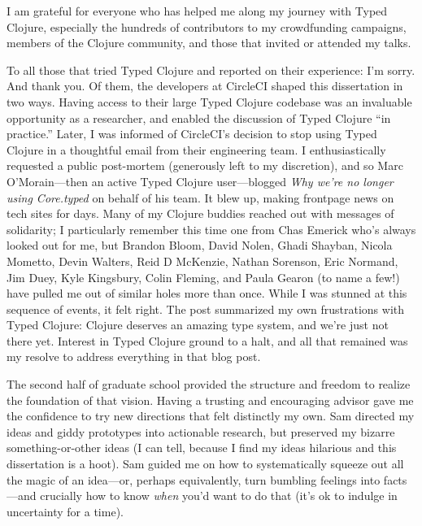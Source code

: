 I am grateful for everyone who has helped me along my journey
with Typed Clojure, especially the hundreds of
contributors to my crowdfunding campaigns, members of the
Clojure community, and those that invited or attended my talks.

To all those that tried Typed Clojure and reported on their experience:
I'm sorry. And thank you.
Of them, the developers at CircleCI shaped this dissertation in two ways.
Having access to their large Typed Clojure
codebase was an invaluable opportunity as a researcher, and enabled the
discussion of Typed Clojure ``in practice.''
Later, I was informed of CircleCI's decision to stop using Typed Clojure
in a thoughtful email from their engineering team.
I enthusiastically requested a public post-mortem (generously left
to my discretion), and so
Marc O'Morain---then an active Typed Clojure user---blogged \emph{Why we're no longer using Core.typed}
on behalf of his team.
It blew up, making frontpage news on tech sites for days.
Many of my Clojure buddies reached out with messages of solidarity; I particularly remember 
this time one from Chas Emerick who's always looked out for me, but Brandon Bloom, David Nolen,
Ghadi Shayban, Nicola Mometto, Devin Walters, Reid D McKenzie, Nathan Sorenson, Eric
Normand, Jim Duey, Kyle Kingsbury, Colin Fleming, and Paula Gearon (to name a few!)
have pulled me out of similar holes more than once.
While I was stunned at this sequence of events, it felt right.
The post summarized my own frustrations with Typed Clojure: Clojure
deserves an amazing type system, and we're just not there yet.
Interest in Typed Clojure ground to a halt,
and all that remained was my resolve to address everything in that blog
post.

The second half of graduate school provided the structure and freedom to
realize the foundation of that vision. Having a trusting and encouraging advisor
gave me the confidence to try new directions that felt distinctly my own.
Sam directed my ideas and giddy prototypes into actionable research,
but preserved my bizarre something-or-other ideas (I can tell, because
I find my ideas hilarious and this dissertation is a hoot).
Sam guided me on how to systematically squeeze out all the magic of an idea---or, perhaps
equivalently, turn bumbling feelings into facts---and crucially how to know \emph{when} you'd
want to do that (it's ok to indulge in uncertainty for a time).

